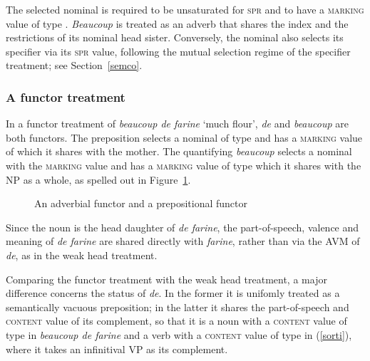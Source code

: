 \documentclass[output=paper
	        ,collection
	        ,collectionchapter
 	        ,biblatex
                ,babelshorthands
                ,newtxmath
                ,draftmode
                ,colorlinks, citecolor=brown
]{langscibook}
\begin{document}
\noindent
The selected nominal is required to be unsaturated for \textsc{spr} and to have a 
\textsc{marking} value of type . \emph{Beaucoup} is treated as an adverb that  
shares the index and the restrictions of its nominal head sister. Conversely, the nominal
also selects its specifier via its \textsc{spr} value, following the mutual 
selection regime of the specifier treatment; see Section~\ref{semco}.


\subsubsection{A functor treatment} 


In a functor treatment of \emph{beaucoup de farine} `much flour', \emph{de} and 
\emph{beaucoup} are both functors. The preposition selects a nominal of type  and 
has a \textsc{marking} value of  which it shares with the mother. 
The quantifying \emph{beaucoup} selects a nominal with the \textsc{marking} value 
 and has a \textsc{marking} value of type  which it 
shares with the NP as a whole, as spelled out in Figure~\ref{beau}.

\begin{figure}
\centering
{}
\caption{\label{beau} An adverbial functor and a prepositional functor}
\end{figure}

Since the noun is the head daughter of \emph{de farine}, the 
part-of-speech, valence and meaning of \emph{de farine} 
are shared directly with \emph{farine}, 
rather than via the AVM of \emph{de}, as in the weak head treatment. 

Comparing the functor treatment with the weak head treatment,  
a major difference concerns the status of \emph{de}. In the former it is 
unifomly treated as a semantically vacuous preposition; in the latter it shares 
the part-of-speech and \textsc{content} value of its complement, so that it is 
a noun with a \textsc{content} value of type  in 
\emph{beaucoup de farine} and a verb with a \textsc{content} value of type 
 in (\ref{sorti}), where it takes 
an infinitival VP as its complement.   
\end{document}

